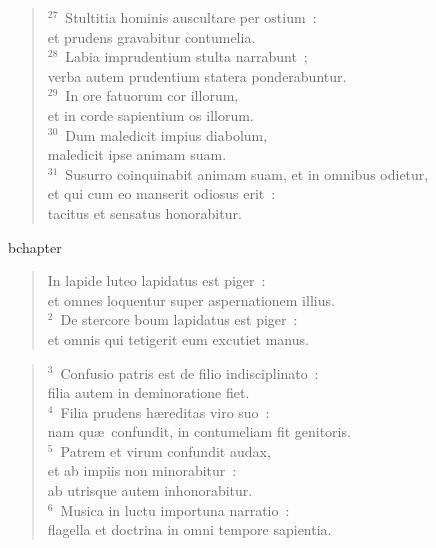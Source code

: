 \begin{verse}
${}^{27}$~Stultitia hominis auscultare per ostium~:\\ et prudens gravabitur contumelia.\\
${}^{28}$~Labia imprudentium stulta narrabunt~;\\ verba autem prudentium statera ponderabuntur.\\
${}^{29}$~In ore fatuorum cor illorum,\\ et in corde sapientium os illorum.\\
${}^{30}$~Dum maledicit impius diabolum,\\ maledicit ipse animam suam.\\
${}^{31}$~Susurro coinquinabit animam suam, et in omnibus odietur,\\ et qui cum eo manserit odiosus erit~:\\ tacitus et sensatus honorabitur.\end{verse}


bchapter\begin{verse}\vspace{-19pt}In lapide luteo lapidatus est piger~:\\ et omnes loquentur super aspernationem illius.\\
${}^{2}$~De stercore boum lapidatus est piger~:\\ et omnis qui tetigerit eum excutiet manus.\end{verse}


\begin{verse}${}^{3}$~Confusio patris est de filio indisciplinato~:\\ filia autem in deminoratione fiet.\\
${}^{4}$~Filia prudens h\ae reditas viro suo~:\\ nam qu\ae\ confundit, in contumeliam fit genitoris.\\
${}^{5}$~Patrem et virum confundit audax,\\ et ab impiis non minorabitur~:\\ ab utrisque autem inhonorabitur.\\
${}^{6}$~Musica in luctu importuna narratio~:\\ flagella et doctrina in omni tempore sapientia.\end{verse}


